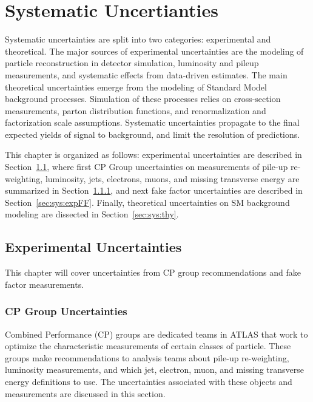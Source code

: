 \chapter{Systematic Uncertianties}
\label{sec:syst}
Systematic uncertainties are split into two categories: experimental and theoretical.  The major sources of experimental uncertainties are the modeling of particle reconstruction in detector simulation, luminosity and pileup measurements, and systematic effects from data-driven estimates.  The main theoretical uncertainties emerge from the modeling of Standard Model background processes.  Simulation of these processes relies on cross-section measurements, parton distribution functions, and renormalization and factorization scale assumptions. Systematic uncertainties propagate to the final expected yields of signal to background, and limit the resolution of predictions. 

This chapter is organized as follows: experimental uncertainties are described in Section~\ref{sec:sys:exp}, where first CP Group uncertainties on measurements of pile-up re-weighting, luminosity, jets, electrons, muons, and missing transverse energy are summarized in Section~\ref{sec:sys:expCP}, and next fake factor uncertainties are described in Section~\ref{sec:sys:expFF}.  Finally, theoretical uncertainties on SM background modeling are dissected in Section~\ref{sec:sys:thy}.

\section{Experimental Uncertainties}
\label{sec:sys:exp}
This chapter will cover uncertainties from CP group recommendations and fake factor measurements.  
\subsection{CP Group Uncertainties}
\label{sec:sys:expCP}
Combined Performance (CP) groups are dedicated teams in ATLAS that work to optimize the characteristic measurements of certain classes of particle.  These groups make recommendations to analysis teams about pile-up re-weighting, luminosity measurements, and which jet, electron, muon, and missing transverse energy definitions to use.  The uncertainties associated with these objects and measurements are discussed in this section.

